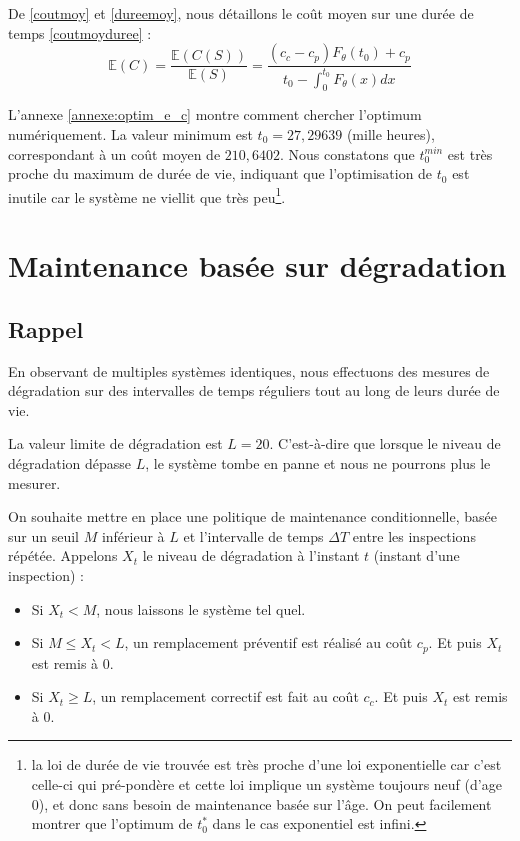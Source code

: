 \documentclass[10pt,a4paper]{article}
\begin{document}
De \eqref{coutmoy} et \eqref{dureemoy}, nous détaillons le coût moyen sur une durée de temps \eqref{coutmoyduree} :
\begin{equation}
    \label{coutmoydureedet}
    \mathbb{E}\left( C \right) = \frac{{\mathbb{E}\left( {C\left( S \right)} \right)}}{{\mathbb{E}\left( S \right)}} = \frac{{\left( {{c_c} - {c_p}} \right){F_\theta }\left( {{t_0}} \right) + {c_p}}}{{{t_0} - \int_0^{{t_0}} {{F_\theta }\left( x \right)dx} }}
\end{equation}

L'annexe \eqref{annexe:optim_e_c} montre comment chercher l'optimum numériquement. La valeur minimum est $t_0 = 27,29639$ (mille heures), correspondant à un coût moyen de $210,6402$. Nous constatons que $t_0^{min}$ est très proche du maximum de durée de vie, indiquant que l'optimisation de $t_0$ est inutile car le système ne viellit que très peu\footnote{la loi de durée de vie trouvée est très proche d'une loi exponentielle car c'est celle-ci qui pré-pondère et cette loi implique un système toujours neuf (d'age 0), et donc sans besoin de maintenance basée sur l'âge. On peut facilement montrer que l'optimum de $t_{0}^{*}$ dans le cas exponentiel est infini.}.

\clearpage

\section{Maintenance basée sur dégradation}
\subsection{Rappel}
En observant de multiples systèmes identiques, nous effectuons des mesures de dégradation sur des intervalles de temps réguliers tout au long de leurs durée de vie.

La valeur limite de dégradation est $L=20$. C'est-à-dire que lorsque le niveau de dégradation dépasse $L$, le système tombe en panne et nous ne pourrons plus le mesurer.

On souhaite mettre en place une politique de maintenance conditionnelle, basée sur un seuil $M$ inférieur à $L$ et l'intervalle de temps $\Delta T$ entre les inspections répétée. Appelons $X_t$ le niveau de dégradation à l'instant $t$ (instant d'une inspection) :
\begin{itemize}
    \item Si $X_t < M$, nous laissons le système tel quel.
    \item Si $M \leq X_t < L$, un remplacement préventif est réalisé au coût $c_p$. Et puis $X_t$ est remis à $0$.
    \item Si $X_t \geq L$, un remplacement correctif est fait au coût $c_c$. Et puis $X_t$ est remis à $0$.
\end{itemize}
\end{document}
